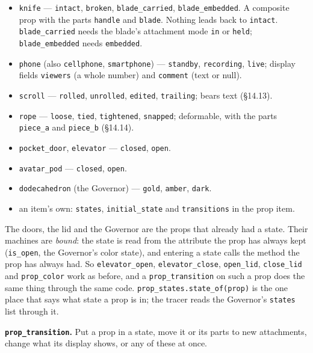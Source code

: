 \documentclass[
  12pt,
  letterpaper,
]{book}
\providecommand{\tightlist}{%
  \setlength{\itemsep}{0pt}\setlength{\parskip}{0pt}}
\begin{document}
\begin{itemize}
\tightlist
\item
  \texttt{knife} --- \texttt{intact}, \texttt{broken},
  \texttt{blade\_carried}, \texttt{blade\_embedded}. A composite prop
  with the parts \texttt{handle} and \texttt{blade}. Nothing leads back
  to \texttt{intact}. \texttt{blade\_carried} needs the blade's
  attachment mode \texttt{in} or \texttt{held};
  \texttt{blade\_embedded} needs \texttt{embedded}.
\item
  \texttt{phone} (also \texttt{cellphone}, \texttt{smartphone}) ---
  \texttt{standby}, \texttt{recording}, \texttt{live}; display fields
  \texttt{viewers} (a whole number) and \texttt{comment} (text or
  null).
\item
  \texttt{scroll} --- \texttt{rolled}, \texttt{unrolled},
  \texttt{edited}, \texttt{trailing}; bears text (\S14.13).
\item
  \texttt{rope} --- \texttt{loose}, \texttt{tied},
  \texttt{tightened}, \texttt{snapped}; deformable, with the parts
  \texttt{piece\_a} and \texttt{piece\_b} (\S14.14).
\item
  \texttt{pocket\_door}, \texttt{elevator} --- \texttt{closed},
  \texttt{open}.
\item
  \texttt{avatar\_pod} --- \texttt{closed}, \texttt{open}.
\item
  \texttt{dodecahedron} (the Governor) --- \texttt{gold},
  \texttt{amber}, \texttt{dark}.
\item
  an item's own: \texttt{states}, \texttt{initial\_state} and
  \texttt{transitions} in the prop item.
\end{itemize}

The doors, the lid and the Governor are the props that already had a
state. Their machines are \emph{bound}: the state is read from the
attribute the prop has always kept (\texttt{is\_open}, the Governor's
color state), and entering a state calls the method the prop has always
had. So \texttt{elevator\_open}, \texttt{elevator\_close},
\texttt{open\_lid}, \texttt{close\_lid} and \texttt{prop\_color} work
as before, and a \texttt{prop\_transition} on such a prop does the same
thing through the same code. \texttt{prop\_states.state\_of(prop)} is
the one place that says what state a prop is in; the tracer reads the
Governor's \texttt{states} list through it.

\textbf{\texttt{prop\_transition}.} Put a prop in a state, move it or
its parts to new attachments, change what its display shows, or any of
these at once.
\end{document}
